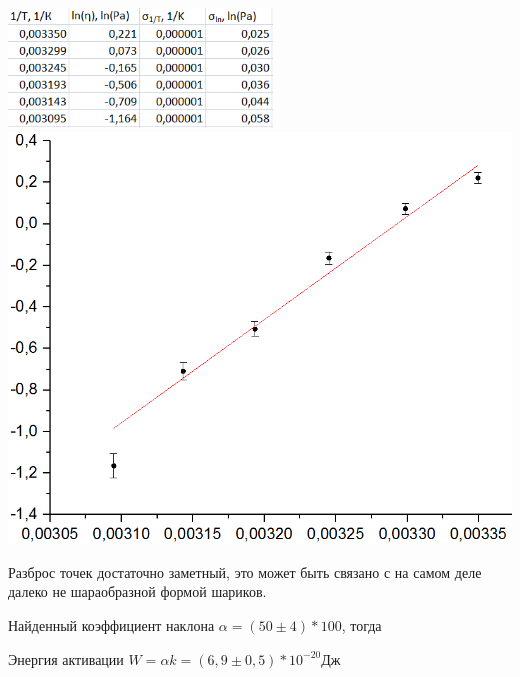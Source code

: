 \documentclass[12pt]{article}
\begin{document}
    \begin{center}
    	\includegraphics[width=7cm]{table2.png}\\
    	\includegraphics[width=14cm]{graph1.png}
    \end{center}
    
    Разброс точек достаточно заметный, это может быть связано с на самом деле далеко не шараобразной формой шариков.
    
    Найденный коэффициент наклона $\alpha = (50 \pm 4) * 100$, тогда
    
    Энергия активации $W = \alpha k = (6,9 \pm 0,5) * 10^{-20} Дж$
\end{document}
